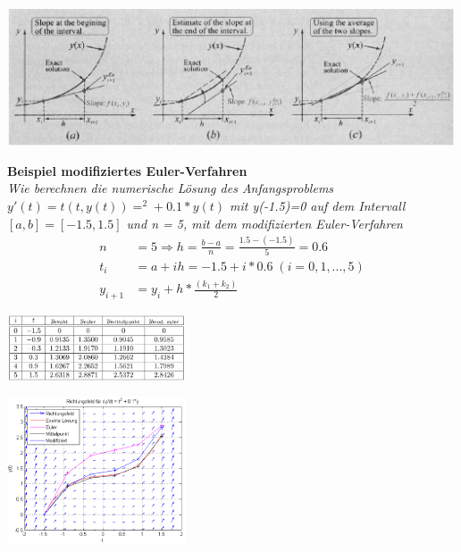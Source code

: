 \documentclass{article}
\newenvironment{Figure}
	{\par\medskip\noindent\minipage{\linewidth}}
	{\endminipage\par\medskip}
\theoremstyle{satz}
\theoremstyle{definition}
\begin{document}
\begin{Figure}
\centering
\includegraphics[width=500px]{img/EulerischeVerfahrenImUeberblick.png}
	\label{fig:Überblick der eulerischen Verfahren}
\end{Figure}

\textbf{Beispiel modifiziertes Euler-Verfahren}\\
\textit{Wie berechnen die numerische Lösung des Anfangsproblems $y'(t) = t(t,y(t)) = ^2 + 0.1 * y(t)$ mit y(-1.5)=0 auf dem Intervall $[a,b] = [-1.5,1.5]$ und n = 5, mit dem modifizierten Euler-Verfahren}
\begin{equation}
\begin{split}
n &= 5 \Rightarrow h = \frac{b-a}{n} = \frac{1.5 - (-1.5)}{5} = 0.6\\
t_i &= a+ih = -1.5 + i * 0.6 \;(i = 0, 1,..., 5)\\
y_{i+1} &= y_i + h * \frac{(k_1 + k_2)}{2}
\end{split}
\end{equation}

\begin{Figure}
\centering
\includegraphics[width=200px]{img/VerfahrenVergleich.png}
	\label{fig:Vergleich der kennengelernten Verfahren}
\end{Figure}
\begin{Figure}
\centering
\includegraphics[width=200px]{img/VerfahrenVergleichRichtungsfeld.png}
	\label{fig:Vergleich der kennengelernten Verfahren anhand des Richtungsfeldes}
\end{Figure}
\end{document}
